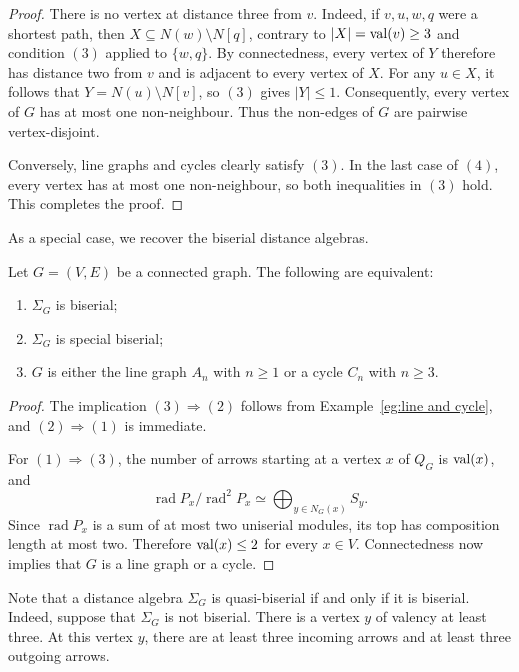 \documentclass[a4paper,leqno]{amsart}
\begin{document}
\begin{proof}
There is no vertex at distance three from $v$. Indeed, if $v,u,w,q$ were a shortest path, then $X\subseteq N(w)\setminus N[q]$,
contrary to $|X|=\operatorname{val}(v)\geq3$ and condition $(3)$ applied to $\{w,q\}$. By connectedness, every vertex of $Y$ therefore has distance two from $v$ and is adjacent to every vertex of $X$. For any $u\in X$, it follows that $Y=N(u)\setminus N[v]$,
so $(3)$ gives $|Y|\leq1$. Consequently, every vertex of $G$ has at most one non-neighbour. Thus the non-edges of $G$ are pairwise vertex-disjoint.

Conversely, line graphs and cycles clearly satisfy $(3)$. In the last case of $(4)$, every vertex has at most one non-neighbour, so both inequalities in $(3)$ hold. This completes the proof.
\end{proof}

As a special case, we recover the biserial distance algebras.

\begin{prop}\label{prop:biserial}
Let $G=(V,E)$ be a connected graph. The following are equivalent:
\begin{enumerate}
\item $\Sigma_G$ is biserial;
\item $\Sigma_G$ is special biserial;
\item $G$ is either the line graph $A_n$ with $n\geq1$ or a cycle $C_n$ with $n\geq3$.
\end{enumerate}
\end{prop}

\begin{proof}
The implication $(3)\Rightarrow(2)$ follows from Example~\ref{eg:line and cycle}, and $(2)\Rightarrow(1)$ is immediate.

For $(1)\Rightarrow(3)$, the number of arrows starting at a vertex $x$ of $Q_G$ is $\operatorname{val}(x)$, and
$$\operatorname{rad}P_x/\operatorname{rad}^2P_x
\simeq\bigoplus_{y\in N_G(x)}S_y.$$
Since $\operatorname{rad}P_x$ is a sum of at most two uniserial modules, its top has composition length at most two. Therefore $\operatorname{val}(x)\leq2$ for every $x\in V$. Connectedness now implies that $G$ is a line graph or a cycle.
\end{proof}

\begin{rmk}
   Note that a distance algebra $\Sigma_G$ is quasi-biserial \cite{Xin24} if and only if it is biserial. Indeed, suppose that $\Sigma_G$ is not biserial. There is a vertex $y$ of valency at least three. At this vertex $y$, there are at least three incoming arrows and at least three outgoing arrows.
\end{rmk}
\end{document}
